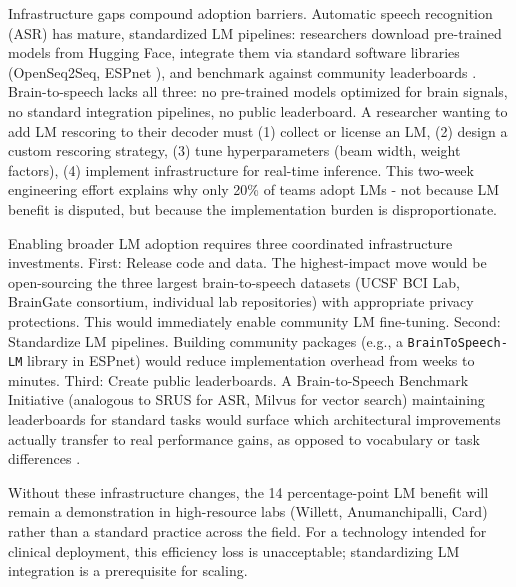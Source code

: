 Infrastructure gaps compound adoption barriers. Automatic speech recognition (ASR) has mature, standardized LM pipelines: researchers download pre-trained models from Hugging Face, integrate them via standard software libraries (OpenSeq2Seq, ESPnet \cite{Watanabe2018,Watanabe2020}), and benchmark against community leaderboards \cite{Panayotov2015}. Brain-to-speech lacks all three: no pre-trained models optimized for brain signals, no standard integration pipelines, no public leaderboard. A researcher wanting to add LM rescoring to their decoder must (1) collect or license an LM, (2) design a custom rescoring strategy, (3) tune hyperparameters (beam width, weight factors), (4) implement infrastructure for real-time inference. This two-week engineering effort explains why only 20\% of teams adopt LMs - not because LM benefit is disputed, but because the implementation burden is disproportionate.

Enabling broader LM adoption requires three coordinated infrastructure investments. First: Release code and data. The highest-impact move would be open-sourcing the three largest brain-to-speech datasets (UCSF BCI Lab, BrainGate consortium, individual lab repositories) with appropriate privacy protections. This would immediately enable community LM fine-tuning. Second: Standardize LM pipelines. Building community packages (e.g., a \texttt{BrainToSpeech-LM} library in ESPnet) would reduce implementation overhead from weeks to minutes. Third: Create public leaderboards. A Brain-to-Speech Benchmark Initiative (analogous to SRUS for ASR, Milvus for vector search) maintaining leaderboards for standard tasks would surface which architectural improvements actually transfer to real performance gains, as opposed to vocabulary or task differences \cite{Willett2024Benchmark}.

Without these infrastructure changes, the 14 percentage-point LM benefit will remain a demonstration in high-resource labs (Willett, Anumanchipalli, Card) rather than a standard practice across the field. For a technology intended for clinical deployment, this efficiency loss is unacceptable; standardizing LM integration is a prerequisite for scaling.

